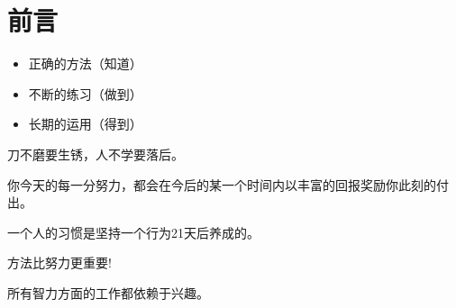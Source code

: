 
\chapter{前言}

\begin{itemize}
\item 正确的方法（知道）
\item 不断的练习（做到）
\item 长期的运用（得到）
\end{itemize}


刀不磨要生锈，人不学要落后。

你今天的每一分努力，都会在今后的某一个时间内以丰富的回报奖励你此刻的付出。

一个人的习惯是坚持一个行为21天后养成的。

方法比努力更重要!

所有智力方面的工作都依赖于兴趣。
